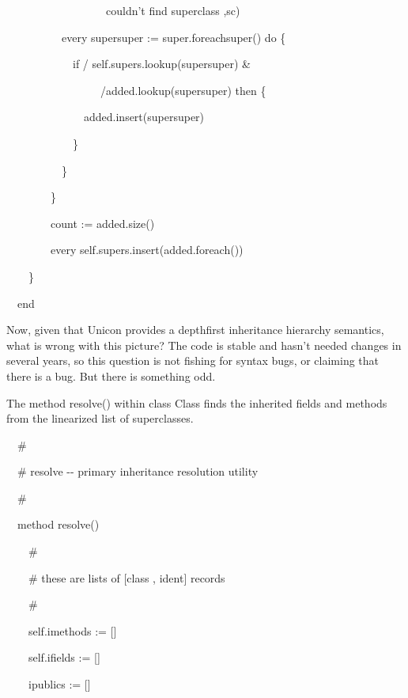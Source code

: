 {\ttfamily\mdseries
\ \ \ \ \ \ \ \ \ \ \ \ \ \ \ \ \ \ couldn't find superclass {\textquotedbl},sc)}

{\ttfamily\mdseries
\ \ \ \ \ \ \ \ \ \ every supersuper := super.foreachsuper() do \{}

{\ttfamily\mdseries
\ \ \ \ \ \ \ \ \ \ \ \ if / self.supers.lookup(supersuper) \&}

{\ttfamily\mdseries
\ \ \ \ \ \ \ \ \ \ \ \ \ \ \ \ \ /added.lookup(supersuper) then \{}

{\ttfamily\mdseries
\ \ \ \ \ \ \ \ \ \ \ \ \ \ added.insert(supersuper)}

{\ttfamily\mdseries
\ \ \ \ \ \ \ \ \ \ \ \ \}}

{\ttfamily\mdseries
\ \ \ \ \ \ \ \ \ \ \}}

{\ttfamily\mdseries
\ \ \ \ \ \ \ \ \}}

{\ttfamily\mdseries
\ \ \ \ \ \ \ \ count := added.size()}

{\ttfamily\mdseries
\ \ \ \ \ \ \ \ every self.supers.insert(added.foreach())}

{\ttfamily\mdseries
\ \ \ \ \}}

{\ttfamily\mdseries
\ \ end}


Now, given that Unicon provides a depthfirst inheritance hierarchy
semantics, what is wrong with this picture? The code is stable and
hasn't needed changes in several years, so this question is not
fishing for syntax bugs, or claiming that there is a bug. But there is
something odd.

The method resolve() within class Class finds the inherited fields and
methods from the linearized list of superclasses.


{\ttfamily\mdseries
\ \ \#}

{\ttfamily\mdseries
\ \ \# resolve -{}- primary inheritance resolution utility}

{\ttfamily\mdseries
\ \ \#}

{\ttfamily\mdseries
\ \ method resolve()}

{\ttfamily\mdseries
\ \ \ \ \#}

{\ttfamily\mdseries
\ \ \ \ \# these are lists of [class , ident] records}

{\ttfamily\mdseries
\ \ \ \ \#}

{\ttfamily\mdseries
\ \ \ \ self.imethods := []}

{\ttfamily\mdseries
\ \ \ \ self.ifields := []}

{\ttfamily\mdseries
\ \ \ \ ipublics := []}

